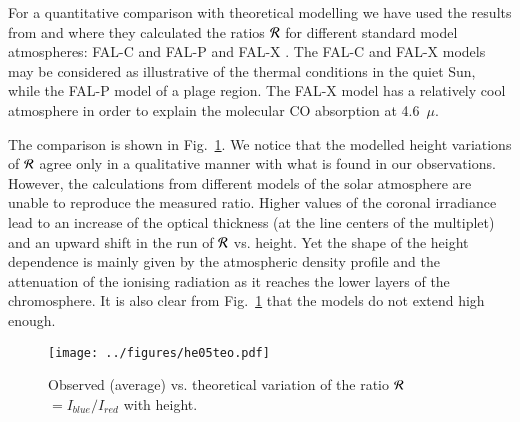 
For a quantitative comparison with theoretical modelling we have 
used the results from \citet{Centeno06} and \cite{cente07} where they calculated the ratios $\cal R$ for different
standard model atmospheres: FAL-C and FAL-P \citep{fontenla91} and 
FAL-X \citep{avrett95}. The FAL-C and FAL-X models may be considered as illustrative of the thermal conditions in the quiet Sun, while the FAL-P model of a plage region. The FAL-X model has a relatively cool atmosphere in order to explain the molecular CO absorption at 4.6~$\mu$.

The comparison is shown in Fig.~\ref{fig:comp}. We notice that the modelled
height variations of $\cal{R}$ agree only in a qualitative manner with what is 
found in our observations. However, the calculations from different models of 
the solar atmosphere are unable to reproduce the measured ratio. Higher values of the coronal irradiance lead to an increase of the optical thickness (at the line centers of the  multiplet) and an upward shift in the run of $\cal{R}$ vs. height. Yet the shape of the height dependence is mainly given by the atmospheric density profile and the attenuation of the ionising radiation as it reaches the lower layers of the chromosphere.
It is also clear from Fig.~\ref{fig:comp} that the models do not extend high enough. 

\begin{figure}[t]
\hspace{-0.5cm}\texttt{[image: ../figures/he05teo.pdf]} 
\caption{Observed (average) vs. theoretical variation of the ratio $\cal R$$ =
  I_{blue}/I_{red}$ 
  with height.}
\label{fig:comp}
\end{figure}

